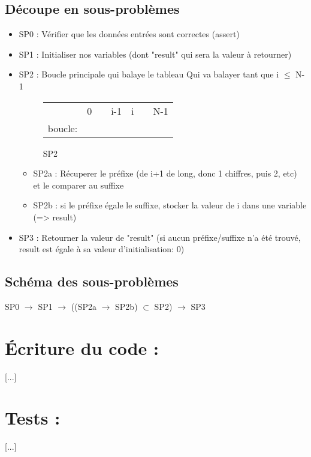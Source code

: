 \documentclass[a4paper, 11pt, oneside]{article}
\begin{document}
	\subsection{Découpe en sous-problèmes}
		\begin{itemize}
		
			\item SP0 : Vérifier que les données entrées sont correctes (assert)
			\item SP1 : Initialiser nos variables (dont "result" qui sera la valeur à retourner)
			\item SP2 : Boucle principale qui balaye le tableau
				\newline
				Qui va balayer tant que i $\leq$ N-1
				\begin{figure}[!h]
					\centering
					\begin{tabular}{l|llr|ll|l}
						& 0 &  & \multicolumn{1}{r|}{i-1} & i &  & N-1 \\ \cline{2-6}
						boucle: & \cellcolor[HTML]{FFCC67} & \cellcolor[HTML]{FFCC67} & \cellcolor[HTML]{FFCC67} &  &  &  \\ \cline{2-6}
					\end{tabular}
					\caption{SP2}
					\label{fig:exemple}
				\end{figure}
				\begin{itemize}
					\item SP2a : Récuperer le préfixe (de i+1 de long, donc 1 chiffres, puis 2, etc) et le comparer au suffixe
					\item SP2b : si le préfixe égale le suffixe, stocker la valeur de i dans une variable (=> result)
				\end{itemize}
			\item SP3 : Retourner la valeur de "result" (si aucun préfixe/suffixe n'a été trouvé, result est égale à sa valeur d'initialisation: 0)
		\end{itemize}
	\subsection{Schéma des sous-problèmes}
		SP0 $\rightarrow$ SP1 $\rightarrow$ ((SP2a $\rightarrow$ SP2b) $\subset$ SP2) $\rightarrow$ SP3

\section{\LARGE \bfseries Écriture du code :}
	[...]

\section{\LARGE \bfseries Tests : }
	[...]
\end{document}
